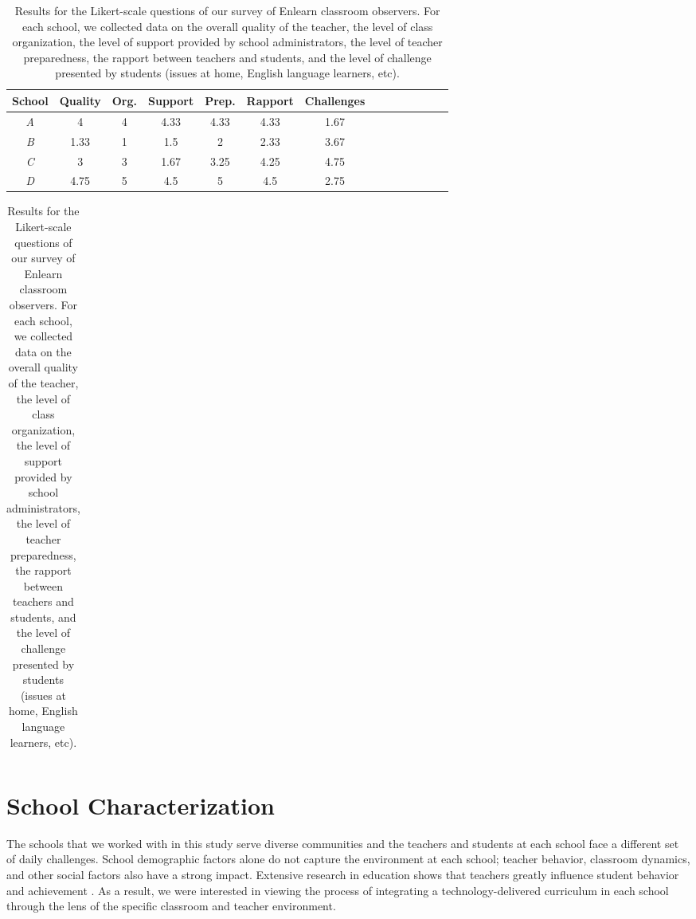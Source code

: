 \documentclass{sigchi}
\begin{document}
\begin{table}
\begin{center}
\scriptsize
\begin{tabular}{ | c | c | c | c | c | c | c | c | c | c | c | c | c | c | }
\hline
\bf{School} & \bf{Quality} & \bf{Org.} & \bf{Support} & \bf{Prep.}  & \bf{Rapport}  & \bf{Challenges}  \\ \hline
\emph{A} & 4 & 4 & 4.33 & 4.33 & 4.33 & 1.67 \\
\emph{B} & 1.33 & 1 & 1.5 & 2 & 2.33 &  3.67 \\ 
\emph{C} & 3 & 3 & 1.67 & 3.25 & 4.25 & 4.75 \\ 
\emph{D} & 4.75 & 5 & 4.5 & 5 & 4.5 & 2.75 \\ \hline
\end{tabular}
\newline
\vspace{0.001in}
\newline
\begin{tabular}{ | l | }
\end{tabular}
\end{center}
\vspace{0.04in}
\caption{Results for the Likert-scale questions of our survey of Enlearn classroom observers. For each school, we collected data on the overall quality of the teacher, the level of class organization, the level of support provided by school administrators, the level of teacher preparedness, the rapport between teachers and students, and the level of challenge presented by students (issues at home, English language learners, etc).}
\label{fig:Ratings}
\end{table}

\section{School Characterization}
The schools that we worked with in this study serve diverse communities and the teachers and students at each school face a different set of daily challenges. School demographic factors alone do not capture the environment at each school; teacher behavior, classroom dynamics, and other social factors also have a strong impact. Extensive research in education shows that teachers greatly influence student behavior and achievement \cite{Hill2005, Wentzel2002, Reeve2004, Wright1997}. As a result, we were interested in viewing the process of integrating a technology-delivered curriculum in each school through the lens of the specific classroom and teacher environment. 
\end{document}
